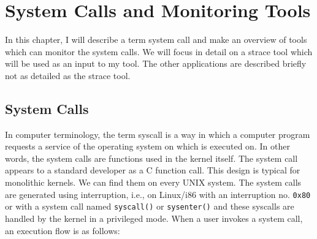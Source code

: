 \chapter{System Calls and Monitoring Tools}
\label{chap:syscalls}
In this chapter, I will describe a term system call and make an overview of tools which can monitor the system calls.
We will focus in detail on a strace tool which will be used as an input to my tool.
The other applications are described briefly not as detailed as the strace tool.

\section{System Calls}

In computer terminology, the term syscall is a way in which a computer program requests a service of the operating system on which is executed on.
In other words, the system calls are functions used in the kernel itself.
The system call appears to a standard developer as a C function call.
This design is typical for monolithic kernels.
We can find them on every UNIX system.
The system calls are generated using interruption, i.e., on Linux/i86 with an interruption no. \texttt{0x80} or with a system call named \texttt{syscall()} or \texttt{sysenter()} and these syscalls are handled by the kernel in a privileged mode.
When a user invokes a system call, an execution flow is as follows:
